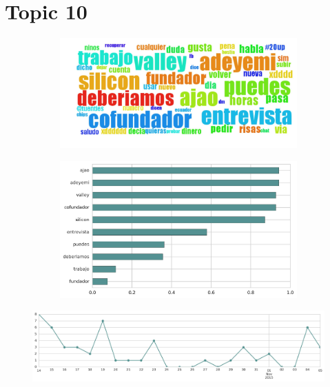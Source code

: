 \section{Topic 10}

\begin{figure}[htbp!]
    \centering
    \begin{subfigure}[b]{0.49\textwidth}
        \includegraphics[width=\textwidth]{twitter_all/report_images/topic-10-wordcloud.jpg}
    \end{subfigure}
    \begin{subfigure}[b]{0.49\textwidth}
        \includegraphics[width=\textwidth]{twitter_all/report_images/topic-10-terms.jpg}
    \end{subfigure}
\end{figure}

\begin{figure}[htbp!]
    \centering
    \includegraphics[width=\textwidth]{twitter_all/report_images/topic-10-timeseries.jpg}
\end{figure}

